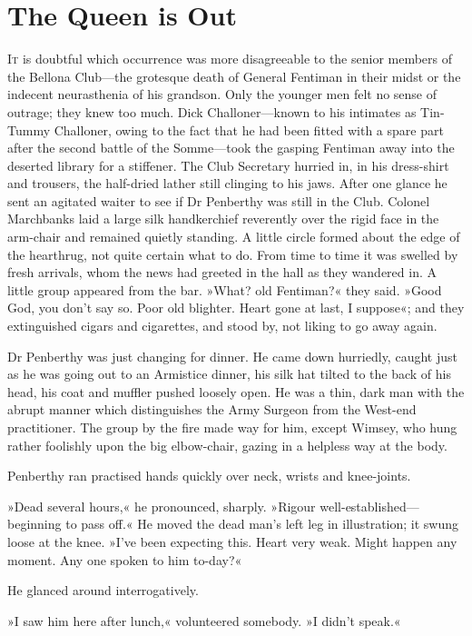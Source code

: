 \chapter{The Queen is Out}
\lettrine[lines=4]{I}{t} is doubtful which occurrence was more disagreeable to the senior members of the Bellona Club—the grotesque death of General Fentiman in their midst or the indecent neurasthenia of his grandson. Only the younger men felt no sense of outrage; they knew too much. Dick Challoner—known to his intimates as Tin-Tummy Challoner, owing to the fact that he had been fitted with a spare part after the second battle of the Somme—took the gasping Fentiman away into the deserted library for a stiffener. The Club Secretary hurried in, in his dress-shirt and trousers, the half-dried lather still clinging to his jaws. After one glance he sent an agitated waiter to see if Dr Penberthy was still in the Club. Colonel Marchbanks laid a large silk handkerchief reverently over the rigid face in the arm-chair and remained quietly standing. A little circle formed about the edge of the hearthrug, not quite certain what to do. From time to time it was swelled by fresh arrivals, whom the news had greeted in the hall as they wandered in. A little group appeared from the bar. »What? old Fentiman?« they said. »Good God, you don't say so. Poor old blighter. Heart gone at last, I suppose«; and they extinguished cigars and cigarettes, and stood by, not liking to go away again.

Dr Penberthy was just changing for dinner. He came down hurriedly, caught just as he was going out to an Armistice dinner, his silk hat tilted to the back of his head, his coat and muffler pushed loosely open. He was a thin, dark man with the abrupt manner which distinguishes the Army Surgeon from the West-end practitioner. The group by the fire made way for him, except Wimsey, who hung rather foolishly upon the big elbow-chair, gazing in a helpless way at the body.

Penberthy ran practised hands quickly over neck, wrists and knee-joints.

»Dead several hours,« he pronounced, sharply. »Rigour well-established—beginning to pass off.« He moved the dead man's left leg in illustration; it swung loose at the knee. »I've been expecting this. Heart very weak. Might happen any moment. Any one spoken to him to-day?«

He glanced around interrogatively.

»I saw him here after lunch,« volunteered somebody. »I didn't speak.«

